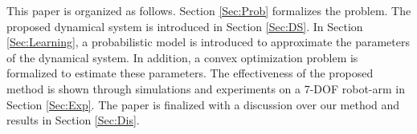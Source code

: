 \documentclass[letterpaper, 10 pt, conference,fleqn]{ieeeconf}
\begin{document}
This paper is organized as follows. Section \ref{Sec:Prob} formalizes the problem. The proposed dynamical system is introduced in Section \ref{Sec:DS}. In Section \ref{Sec:Learning}, a probabilistic model is introduced to approximate the parameters of the dynamical system. In addition, a convex optimization problem is  formalized to estimate these parameters. The effectiveness of the proposed method is shown through simulations and experiments on a 7-DOF robot-arm in Section \ref{Sec:Exp}. The paper is finalized with a discussion over our method and results in Section \ref{Sec:Dis}.

\end{document}
